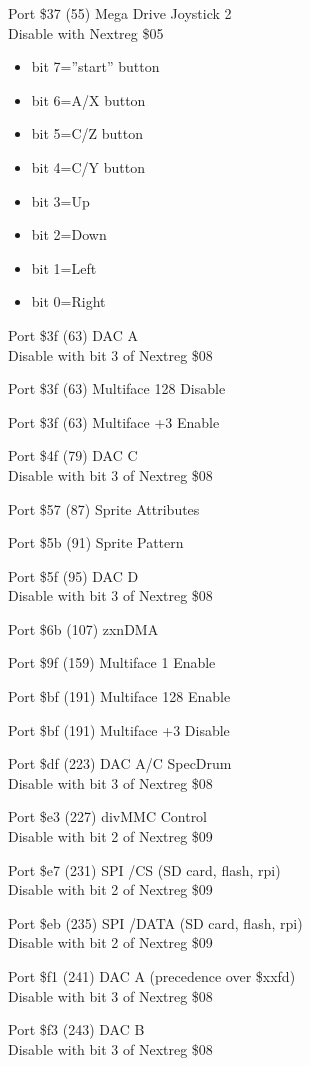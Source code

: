 Port \$37 (55) Mega Drive Joystick 2\\
Disable with Nextreg \$05
\begin{itemize}
\item[] bit 7=''start'' button
\item[] bit 6=A/X button
\item[] bit 5=C/Z button
\item[] bit 4=C/Y button
\item[] bit 3=Up
\item[] bit 2=Down
\item[] bit 1=Left
\item[] bit 0=Right
\end{itemize}

Port \$3f (63) DAC A\\
Disable with bit 3 of Nextreg \$08

Port \$3f (63) Multiface 128 Disable

Port \$3f (63) Multiface +3 Enable

Port \$4f (79) DAC C\\
Disable with bit 3 of Nextreg \$08

Port \$57 (87) Sprite Attributes

Port \$5b (91) Sprite Pattern

Port \$5f (95) DAC D\\
Disable with bit 3 of Nextreg \$08

Port \$6b (107) zxnDMA

Port \$9f (159) Multiface 1 Enable

Port \$bf (191) Multiface 128 Enable

Port \$bf (191) Multiface +3 Disable

Port \$df (223) DAC A/C SpecDrum\\
Disable with bit 3 of Nextreg \$08

Port \$e3 (227) divMMC Control\\
Disable with bit 2 of Nextreg \$09

Port \$e7 (231) SPI /CS (SD card, flash, rpi)\\
Disable with bit 2 of Nextreg \$09

Port \$eb (235) SPI /DATA (SD card, flash, rpi)\\
Disable with bit 2 of Nextreg \$09

Port \$f1 (241) DAC A (precedence over \$xxfd)\\
Disable with bit 3 of Nextreg \$08

Port \$f3 (243) DAC B\\
Disable with bit 3 of Nextreg \$08

